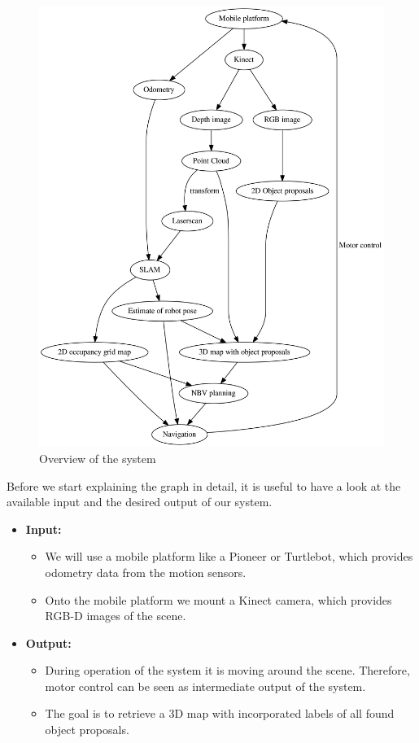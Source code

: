 \documentclass[a4paper,11pt,english]{article}
\begin{document}
\begin{figure}
	\begin{center}
		\includegraphics[width=1\linewidth]{dot/overview.png} 
		\caption{Overview of the system}
		\label{fig:overview}
	\end{center}
\end{figure}

Before we start explaining the graph in detail, it is useful to have a look at the available input and the desired output of our system.
\begin{itemize}
	\item \textbf{Input:}
	\begin{itemize}
		\item We will use a mobile platform like a Pioneer or Turtlebot, which provides odometry data from the motion sensors.
		\item Onto the mobile platform we mount a Kinect camera, which provides RGB-D images of the scene.
	\end{itemize}
	\item \textbf{Output:}
	\begin{itemize}
		\item During operation of the system it is moving around the scene.
		Therefore, motor control can be seen as intermediate output of the system.
		\item The goal is to retrieve a 3D map with incorporated labels of all found object proposals.
	\end{itemize}  
\end{itemize}
\end{document}
